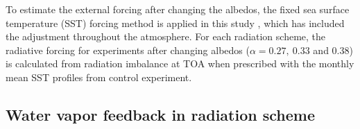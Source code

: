 To estimate the external forcing after changing the albedos, the fixed sea surface temperature (SST) forcing method is applied in this study \citep{Hansen2005,Feldl2013,Kim2018}, which has included the adjustment throughout the atmosphere. For each radiation scheme, the radiative forcing for experiments after changing albedos ($\alpha=0.27, ~0.33$ and $0.38$) is calculated from radiation imbalance at TOA when prescribed with the monthly mean SST profiles from control experiment.


\subsection{Water vapor feedback in radiation scheme}
\label{sec:wv_fb_setup}

